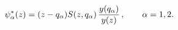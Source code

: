 \begin{equation}
\psi^*_\alpha (z) = (z-q_\alpha)S(z,q_\alpha)  \, {y(q_\alpha
)\over y(z)} \, , \qquad \alpha = 1, 2.
\end{equation}

